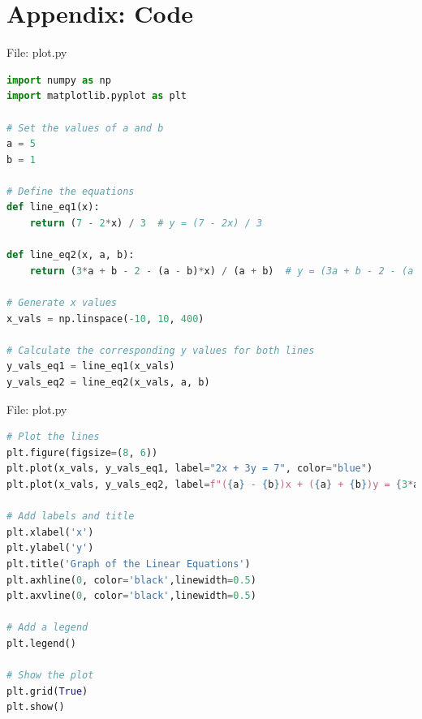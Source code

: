 \documentclass{beamer}
\numberwithin{equation}{section}
\theoremstyle{remark}
\begin{document}
\section*{Appendix: Code}
\begin{frame}[fragile]{File: plot.py}
\begin{lstlisting}[language=Python]
import numpy as np
import matplotlib.pyplot as plt

# Set the values of a and b
a = 5
b = 1

# Define the equations
def line_eq1(x):
    return (7 - 2*x) / 3  # y = (7 - 2x) / 3

def line_eq2(x, a, b):
    return (3*a + b - 2 - (a - b)*x) / (a + b)  # y = (3a + b - 2 - (a - b)x) / (a + b)

# Generate x values
x_vals = np.linspace(-10, 10, 400)

# Calculate the corresponding y values for both lines
y_vals_eq1 = line_eq1(x_vals)
y_vals_eq2 = line_eq2(x_vals, a, b)
\end{lstlisting}
\end{frame}

\begin{frame}[fragile]{File: plot.py}
\begin{lstlisting}[language=Python]
# Plot the lines
plt.figure(figsize=(8, 6))
plt.plot(x_vals, y_vals_eq1, label="2x + 3y = 7", color="blue")
plt.plot(x_vals, y_vals_eq2, label=f"({a} - {b})x + ({a} + {b})y = {3*a + b - 2}", color="red", linestyle="--")

# Add labels and title
plt.xlabel('x')
plt.ylabel('y')
plt.title('Graph of the Linear Equations')
plt.axhline(0, color='black',linewidth=0.5)
plt.axvline(0, color='black',linewidth=0.5)

# Add a legend
plt.legend()

# Show the plot
plt.grid(True)
plt.show()

\end{lstlisting}
\end{frame}
\end{document}
